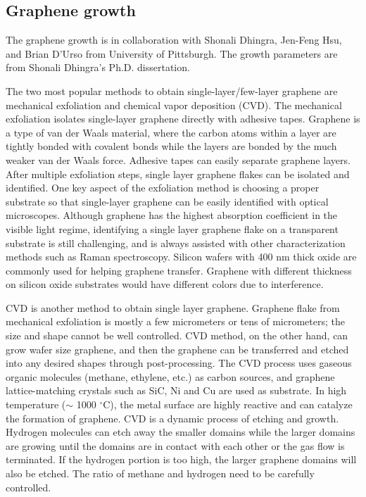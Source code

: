 \documentclass[pdflatex, sectionletters, 12pt, final, phd]{pittetd}    %
\begin{document}
\subsection{Graphene growth}

The graphene growth is in collaboration with Shonali Dhingra, Jen-Feng Hsu, and Brian D'Urso from University of Pittsburgh. The growth parameters are from Shonali Dhingra's Ph.D. dissertation\cite{dhingra2015quadratic}.

The two most popular methods to obtain single-layer/few-layer graphene are mechanical exfoliation\cite{novoselov2004electric} and chemical vapor deposition (CVD)\cite{kim2009large}. The mechanical exfoliation isolates single-layer graphene directly with adhesive tapes. Graphene is a type of van der Waals material, where the carbon atoms within a layer are tightly bonded with covalent bonds while the layers are bonded by the much weaker van der Waals force. Adhesive tapes can easily separate graphene layers. After multiple exfoliation steps, single layer graphene flakes can be isolated and identified\cite{novoselov2004electric}. One key aspect of the exfoliation method is choosing a proper substrate so that single-layer graphene can be easily identified with optical microscopes. Although graphene has the highest absorption coefficient in the visible light regime\cite{nair2008fine}, identifying a single layer graphene flake on a transparent substrate is still challenging, and is always assisted with other characterization methods such as Raman spectroscopy\cite{ferrari2006raman}. Silicon wafers with 400 nm thick oxide are commonly used for helping graphene transfer. Graphene with different thickness on silicon oxide substrates would have different colors due to interference.

CVD is another method to obtain single layer graphene\cite{kim2009large}. Graphene flake from mechanical exfoliation is mostly a few micrometers or tens of micrometers; the size and shape cannot be well controlled. CVD method, on the other hand, can grow wafer size graphene\cite{lee2010wafer}, and then the graphene can be transferred and etched into any desired shapes through post-processing. The CVD process uses gaseous organic molecules (methane, ethylene, etc.) as carbon sources, and graphene lattice-matching crystals such as SiC, Ni and Cu are used as substrate. In high temperature ($\sim$ 1000 $^{\circ}$C), the metal surface are highly reactive and can catalyze the formation of graphene. CVD is a dynamic process of etching and growth. Hydrogen molecules can etch away the smaller domains while the larger domains are growing\cite{vlassiouk2011role, zhang2012anisotropic} until the domains are in contact with each other or the gas flow is terminated. If the hydrogen portion is too high, the larger graphene domains will also be etched. The ratio of methane and hydrogen need to be carefully controlled.
\end{document}
